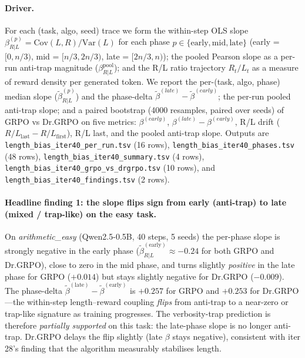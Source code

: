 \documentclass{article}
\begin{document}
\paragraph{Driver.}
For each (task, algo, seed) trace we form the within-step OLS slope
$\beta_{R|L}^{(p)} = \mathrm{Cov}(L,R)/\mathrm{Var}(L)$ for each phase
$p \in \{\mathrm{early},\mathrm{mid},\mathrm{late}\}$ (early =
$[0, n/3)$, mid = $[n/3, 2n/3)$, late = $[2n/3, n)$); the pooled
Pearson slope as a per-run anti-trap magnitude
($\beta_{R|L}^{\mathrm{pool}}$); and the R/L ratio trajectory
$R_t / L_t$ as a measure of reward density per generated token.  We
report the per-(task, algo, phase) median slope
($\tilde\beta_{R|L}^{(p)}$) and the phase-delta
$\tilde\beta^{(late)} - \tilde\beta^{(early)}$; the per-run pooled
anti-trap slope; and a paired bootstrap (4000 resamples, paired over
seeds) of GRPO vs Dr.GRPO on five metrics:
$\beta^{(early)}$, $\beta^{(late)}-\beta^{(early)}$, R/L drift
($R/L_{\mathrm{last}} - R/L_{\mathrm{first}}$), R/L last, and the
pooled anti-trap slope.  Outputs are
\texttt{length\_bias\_iter40\_per\_run.tsv} (16 rows),
\texttt{length\_bias\_iter40\_phases.tsv} (48 rows),
\texttt{length\_bias\_iter40\_summary.tsv} (4 rows),
\texttt{length\_bias\_iter40\_grpo\_vs\_drgrpo.tsv} (10 rows), and
\texttt{length\_bias\_iter40\_findings.tsv} (2 rows).

\paragraph{Headline finding 1: the slope flips sign from early
(anti-trap) to late (mixed / trap-like) on the easy task.}
On \emph{arithmetic\_easy} (Qwen2.5-0.5B, 40 steps, 5 seeds) the
per-phase slope is strongly negative in the early phase
($\tilde\beta_{R|L}^{(\mathrm{early})} \approx -0.24$ for both GRPO
and Dr.GRPO), close to zero in the mid phase, and turns slightly
\emph{positive} in the late phase for GRPO ($+0.014$) but stays
slightly negative for Dr.GRPO ($-0.009$).  The phase-delta
$\tilde\beta^{(\mathrm{late})} - \tilde\beta^{(\mathrm{early})}$ is
$+0.257$ for GRPO and $+0.253$ for Dr.GRPO---the within-step
length--reward coupling \emph{flips} from anti-trap to a near-zero
or trap-like signature as training progresses.  The verbosity-trap
prediction is therefore \emph{partially supported} on this task: the
late-phase slope is no longer anti-trap.  Dr.GRPO delays the flip
slightly (late $\beta$ stays negative), consistent with iter 28's
finding that the algorithm measurably stabilises length.
\end{document}
